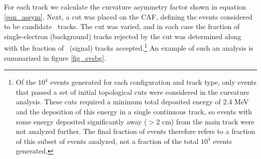 \documentclass{JINST}
\begin{document}
For each track we calculate the curvature asymmetry factor shown in equation \ref{eqn_assym}. Next, a cut was placed on the CAF, defining the events considered to be candidate 
\bbonu\ tracks.  The cut was varied, and in each case 
the fraction of single-electron (background) tracks rejected by the cut was determined along with the fraction of 
\bbonu\ (signal) tracks accepted.\footnote{Of the $10^4$ events generated for each configuration and track type, only events that passed a set of initial topological cuts were considered in the curvature analysis.  These cuts required a minimum total deposited energy of 2.4 MeV and the deposition of this energy in a single continuous track, so events with some energy deposited significantly away ($> 2$ cm) from the main track were not analyzed further.  The final fraction of events therefore refers to a fraction of this subset of events analyzed, not a fraction of the total $10^4$ events generated.}  An example of such an analysis is summarized in figure \ref{fig_svsbg}.
\end{document}
